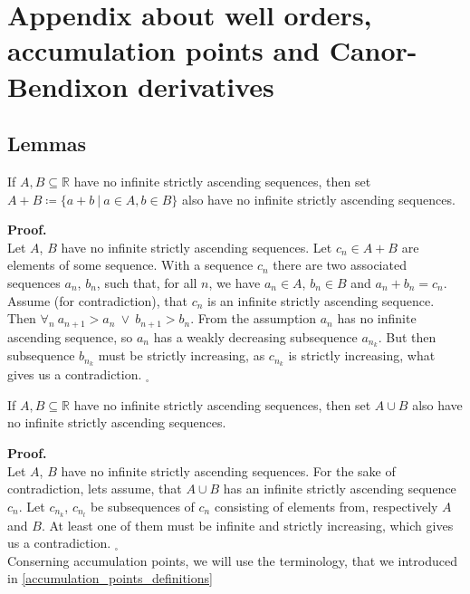 \chapter{Appendix about well orders, accumulation points and Canor-Bendixon derivatives}


\section{Lemmas}
\begin{lemma}\label{two_sets_lemma}
If $A, B \subseteq \mathbb{R}$ have no infinite strictly ascending sequences, then set 
$A + B \coloneqq \{a+b\ |\ a \in A, b \in B\}$ also have no infinite strictly ascending sequences. 
\end{lemma}
\noindent\textbf{Proof.} \\
Let $A$, $B$ have no infinite strictly ascending sequences. 
Let $c_n \in A + B$ are elements of some sequence. With a sequence $c_n$ there are 
two associated sequences $a_n$, $b_n$, such that, for all $n$, we have $a_n \in A$, 
$b_n \in B$ and 
$a_n + b_n = c_n$. Assume (for contradiction), that $c_n$ is an infinite strictly 
ascending sequence. 
Then $\forall_n\ a_{n+1}>a_n\ \lor\ b_{n+1} > b_n$. From the assumption $a_n$ has no infinite 
ascending sequence, so $a_n$ has a weakly decreasing subsequence $a_{n_k}$. But then 
subsequence $b_{n_k}$ must be strictly increasing, as $c_{n_k}$ is strictly increasing, what gives 
us a contradiction. 
$_\square$ 

\begin{lemma}\label{sum_lemma}
If $A, B \subseteq \mathbb{R}$ have no infinite strictly ascending sequences, then set 
$A \cup B$ also have no infinite strictly ascending sequences.
\end{lemma}
\textbf{Proof.} \\
Let $A$, $B$ have no infinite strictly ascending sequences. 
For the sake of contradiction, lets assume, that $A \cup B$ has an infinite strictly 
ascending sequence $c_n$. Let $c_{n_k}$, $c_{n_l}$ be subsequences of $c_n$ consisting 
of elements from, respectively $A$ and $B$. At least one of them must be infinite and 
strictly increasing, which gives us a contradiction. $_\square$ \\


Conserning accumulation points, we will use the terminology, that we introduced in 
\ref{accumulation_points_definitions}

